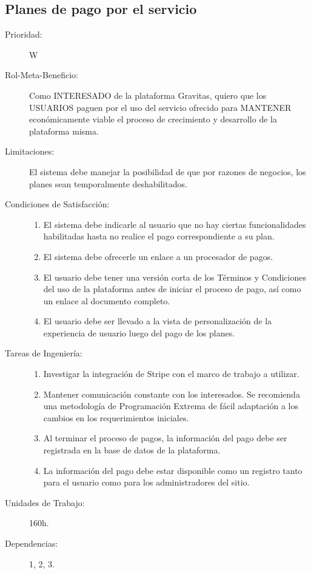 \newpage
    
    
\subsection{Planes de pago por el servicio}

\begin{description}
    \item[Prioridad:] W
    \item[Rol-Meta-Beneficio:] Como INTERESADO de la plataforma Gravitas, quiero que los USUARIOS paguen por el uso del servicio ofrecido para MANTENER económicamente viable el proceso de crecimiento y desarrollo de la plataforma misma.
    \item[Limitaciones:] El sistema debe manejar la posibilidad de que por razones de negocios, los planes sean temporalmente deshabilitados.
    \item[Condiciones de Satisfacción:] \hfill
        \begin{enumerate}
            \item El sistema debe indicarle al usuario que no hay ciertas funcionalidades habilitadas hasta no realice el pago correspondiente a su plan.
            \item El sistema debe ofrecerle un enlace a un procesador de pagos.
            \item El usuario debe tener una versión corta de los Términos y Condiciones del uso de la plataforma antes de iniciar el proceso de pago, así como un enlace al documento completo.
            \item El usuario debe ser llevado a la vista de personalización de la experiencia de usuario luego del pago de los planes.
        \end{enumerate}
    \item[Tareas de Ingeniería:] \hfill
        \begin{enumerate}
            \item Investigar la integración de Stripe con el marco de trabajo a utilizar.
            \item Mantener comunicación constante con los interesados. Se recomienda una metodología de Programación Extrema de fácil adaptación a los cambios en los requerimientos iniciales.
            \item Al terminar el proceso de pagos, la información del pago debe ser registrada en la base de datos de la plataforma.
            \item La información del pago debe estar disponible como un registro tanto para el usuario como para los administradores del sitio.
        \end{enumerate}
    \item[Unidades de Trabajo:] 160h.
    \item[Dependencias:] 1, 2, 3.
\end{description}

